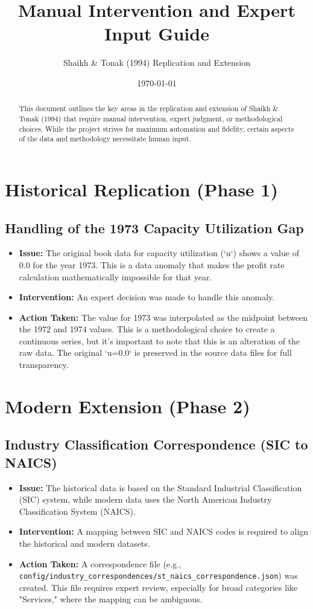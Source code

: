 \documentclass[12pt,a4paper]{article}
\title{Manual Intervention and Expert Input Guide}
\author{Shaikh \& Tonak (1994) Replication and Extension}
\date{\today}
\begin{document}
\maketitle

\begin{abstract}
This document outlines the key areas in the replication and extension of Shaikh \& Tonak (1994) that require manual intervention, expert judgment, or methodological choices. While the project strives for maximum automation and fidelity, certain aspects of the data and methodology necessitate human input.
\end{abstract}

\section{Historical Replication (Phase 1)}

\subsection{Handling of the 1973 Capacity Utilization Gap}
\begin{itemize}
    \item \textbf{Issue:} The original book data for capacity utilization (`u`) shows a value of 0.0 for the year 1973. This is a data anomaly that makes the profit rate calculation mathematically impossible for that year.
    \item \textbf{Intervention:} An expert decision was made to handle this anomaly.
    \item \textbf{Action Taken:} The value for 1973 was interpolated as the midpoint between the 1972 and 1974 values. This is a methodological choice to create a continuous series, but it's important to note that this is an alteration of the raw data. The original `u=0.0` is preserved in the source data files for full transparency.
\end{itemize}

\section{Modern Extension (Phase 2)}

\subsection{Industry Classification Correspondence (SIC to NAICS)}
\begin{itemize}
    \item \textbf{Issue:} The historical data is based on the Standard Industrial Classification (SIC) system, while modern data uses the North American Industry Classification System (NAICS).
    \item \textbf{Intervention:} A mapping between SIC and NAICS codes is required to align the historical and modern datasets.
    \item \textbf{Action Taken:} A correspondence file (e.g., \texttt{config/industry\_correspondences/st\_naics\_correspondence.json}) was created. This file requires expert review, especially for broad categories like "Services," where the mapping can be ambiguous.
\end{itemize}
\end{document}
